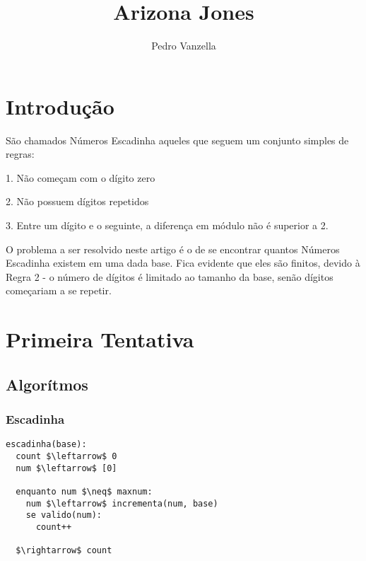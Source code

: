 \documentclass[12pt]{article}
\title{Arizona Jones}
\author{Pedro Vanzella\inst{1}}
\newenvironment{lyxlist}[1]
{\begin{list}{}
{\settowidth{\labelwidth}{#1}
 \setlength{\leftmargin}{\labelwidth}
 \addtolength{\leftmargin}{\labelsep}
 \renewcommand{\makelabel}[1]{##1\hfil}}}
{\end{list}}
\begin{document}
\maketitle
\begin{abstract}
\end{abstract}
\begin{resumo}
\end{resumo}


\section{Introdução}\label{section:intro}

São chamados Números Escadinha aqueles que seguem um conjunto simples
de regras:
\begin{lyxlist}{00.00.0000}
\item [{1.}] Não começam com o dígito zero
\item [{2.}] Não possuem dígitos repetidos
\item [{3.}] Entre um dígito e o seguinte, a diferença em módulo não é
superior a 2.
\end{lyxlist}
O problema a ser resolvido neste artigo é o de se encontrar quantos
Números Escadinha existem em uma dada base. Fica evidente que eles
são finitos, devido à Regra 2 - o número de dígitos é limitado ao
tamanho da base, senão dígitos começariam a se repetir.


\section{Primeira Tentativa}\label{section:primeira}


\subsection{Algorítmos}\label{section:primeira:algoritmos}


\subsubsection{Escadinha}\label{section:primeira:algoritmos:escadinha}

\begin{lstlisting}
escadinha(base):
  count $\leftarrow$ 0
  num $\leftarrow$ [0] 
	
  enquanto num $\neq$ maxnum: 
    num $\leftarrow$ incrementa(num, base) 
    se valido(num):
      count++

  $\rightarrow$ count
\end{lstlisting}
\end{document}
